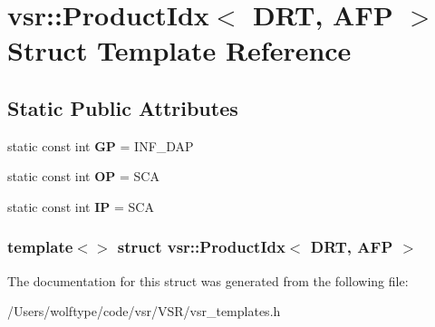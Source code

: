 \hypertarget{structvsr_1_1_product_idx_3_01_d_r_t_00_01_a_f_p_01_4}{\section{vsr\-:\-:Product\-Idx$<$ D\-R\-T, A\-F\-P $>$ Struct Template Reference}
\label{structvsr_1_1_product_idx_3_01_d_r_t_00_01_a_f_p_01_4}
}
\subsection*{Static Public Attributes}
\begin{DoxyCompactItemize}
\item 
\hypertarget{structvsr_1_1_product_idx_3_01_d_r_t_00_01_a_f_p_01_4_af99330fcb2cb877ed6eaaf3e4fee70cb}{static const int {\bfseries G\-P} = I\-N\-F\-\_\-\-D\-A\-P}\label{structvsr_1_1_product_idx_3_01_d_r_t_00_01_a_f_p_01_4_af99330fcb2cb877ed6eaaf3e4fee70cb}

\item 
\hypertarget{structvsr_1_1_product_idx_3_01_d_r_t_00_01_a_f_p_01_4_a07fdeed32e08e82e8a8811c06a087084}{static const int {\bfseries O\-P} = S\-C\-A}\label{structvsr_1_1_product_idx_3_01_d_r_t_00_01_a_f_p_01_4_a07fdeed32e08e82e8a8811c06a087084}

\item 
\hypertarget{structvsr_1_1_product_idx_3_01_d_r_t_00_01_a_f_p_01_4_a6c39a36acc410d1dfddafabb17214249}{static const int {\bfseries I\-P} = S\-C\-A}\label{structvsr_1_1_product_idx_3_01_d_r_t_00_01_a_f_p_01_4_a6c39a36acc410d1dfddafabb17214249}

\end{DoxyCompactItemize}
\subsubsection*{template$<$$>$ struct vsr\-::\-Product\-Idx$<$ D\-R\-T, A\-F\-P $>$}



The documentation for this struct was generated from the following file\-:\begin{DoxyCompactItemize}
\item 
/\-Users/wolftype/code/vsr/\-V\-S\-R/vsr\-\_\-templates.\-h\end{DoxyCompactItemize}
